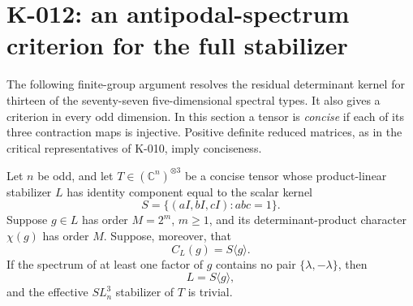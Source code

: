 \section{K-012: an antipodal-spectrum criterion for the full stabilizer}

The following finite-group argument resolves the residual determinant
kernel for thirteen of the seventy-seven five-dimensional spectral types.
It also gives a criterion in every odd dimension.  In this section a
tensor is \emph{concise} if each of its three contraction maps is injective.
Positive definite reduced matrices, as in the critical representatives
of K-010, imply conciseness.

\begin{theorem}[K-012]
Let $n$ be odd, and let $T\in(\mathbb C^n)^{\otimes3}$ be a concise
tensor whose product-linear stabilizer $L$ has identity component equal
to the scalar kernel
\[
 S=\{(aI,bI,cI):abc=1\}.
\]
Suppose $g\in L$ has order $M=2^m$, $m\ge1$, and its determinant-product character
$\chi(g)$ has order $M$.  Suppose, moreover, that
\[
                   C_L(g)=S\langle g\rangle.                 \tag{K-012a}
\]
If the spectrum of at least one factor of $g$ contains no pair
$\{\lambda,-\lambda\}$, then
\[
                    L=S\langle g\rangle,
\]
and the effective $SL_n^3$ stabilizer of $T$ is trivial.
\end{theorem}

